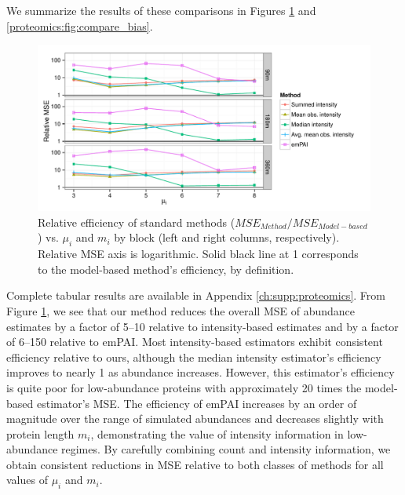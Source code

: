 We summarize the results of these comparisons in Figures \ref{proteomics:fig:compare_relative_error} and \ref{proteomics:fig:compare_bias}.
%
\ifx\nofigures\undefined
\begin{figure}
\centering
\includegraphics[width=\textwidth, page=3]{figures/proteomics/figures_relative_error_sim}
\caption{Relative efficiency of standard methods ($MSE_{Method} / MSE_{Model-based}$) vs. $\mu_i$ and $m_i$ by block (left and right columns, respectively). Relative MSE axis is logarithmic. Solid black line at 1 corresponds to the model-based method's efficiency, by definition.
\label{proteomics:fig:compare_relative_error}}
\end{figure}
\fi
%
Complete tabular results are available in Appendix \ref{ch:supp:proteomics}.
From Figure \ref{proteomics:fig:compare_relative_error}, we see that our method reduces the overall MSE of abundance estimates by a factor of 5--10 relative to intensity-based estimates and by a factor of 6--150 relative to emPAI.
Most intensity-based estimators exhibit consistent efficiency relative to ours, although the median intensity estimator's efficiency improves to nearly 1 as abundance increases.
However, this estimator's efficiency is quite poor for low-abundance proteins with approximately 20 times the model-based estimator's MSE.
The efficiency of emPAI increases by an order of magnitude over the range of simulated abundances and decreases slightly with protein length $m_i$, demonstrating the value of intensity information in low-abundance regimes.
By carefully combining count and intensity information, we obtain consistent reductions in MSE relative to both classes of methods for all values of $\mu_i$ and $m_i$.


